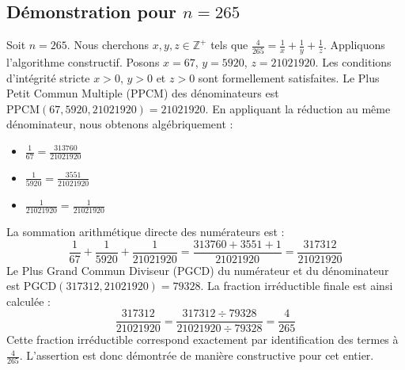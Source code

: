 \documentclass[11pt,a4paper]{article}
\begin{document}
\subsection{Démonstration pour $n = 265$}
Soit $n = 265$. Nous cherchons $x, y, z \in \mathbb{Z}^{+}$ tels que $\frac{4}{265} = \frac{1}{x} + \frac{1}{y} + \frac{1}{z}$.
Appliquons l'algorithme constructif. Posons $x = 67$, $y = 5920$, $z = 21021920$.
Les conditions d'intégrité stricte $x > 0$, $y > 0$ et $z > 0$ sont formellement satisfaites.
Le Plus Petit Commun Multiple (PPCM) des dénominateurs est $\text{PPCM}(67, 5920, 21021920) = 21021920$.
En appliquant la réduction au même dénominateur, nous obtenons algébriquement :
\begin{itemize}
    \item $\frac{1}{67} = \frac{313760}{21021920}$
    \item $\frac{1}{5920} = \frac{3551}{21021920}$
    \item $\frac{1}{21021920} = \frac{1}{21021920}$
\end{itemize}
La sommation arithmétique directe des numérateurs est :
$$ \frac{1}{67} + \frac{1}{5920} + \frac{1}{21021920} = \frac{313760 + 3551 + 1}{21021920} = \frac{317312}{21021920} $$
Le Plus Grand Commun Diviseur (PGCD) du numérateur et du dénominateur est $\text{PGCD}(317312, 21021920) = 79328$.
La fraction irréductible finale est ainsi calculée :
$$ \frac{317312}{21021920} = \frac{317312 \div 79328}{21021920 \div 79328} = \frac{4}{265} $$
Cette fraction irréductible correspond exactement par identification des termes à $\frac{4}{265}$. L'assertion est donc démontrée de manière constructive pour cet entier.
\end{document}
